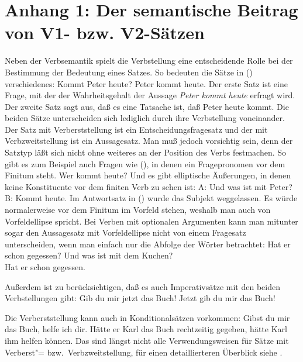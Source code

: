 \section{Anhang 1: Der semantische Beitrag von V1- bzw. V2-Sätzen}
\label{sec-semantik-v1-v2}

%

Neben der Verbsemantik spielt die Verbstellung eine entscheidende Rolle bei der
Bestimmung der Bedeutung eines Satzes. So bedeuten die Sätze in () verschiedenes:
\eal
\ex Kommt Peter heute? 
\ex Peter kommt heute.
\zl
Der erste Satz ist eine Frage, mit der der Wahrheitsgehalt der Aussage \emph{Peter kommt heute}
erfragt wird. Der zweite Satz sagt aus, daß es eine Tatsache ist, daß Peter heute kommt. Die beiden
Sätze unterscheiden sich lediglich durch ihre Verbstellung voneinander. Der Satz mit Verberststellung
ist ein Entscheidungsfragesatz und der mit Verbzweitstellung ist ein
Aussagesatz. Man muß jedoch vorsichtig sein, denn der Satztyp läßt sich
nicht ohne weiteres an der Position des Verbs festmachen. So gibt es zum Beispiel auch Fragen wie
(), in denen ein Fragepronomen vor dem Finitum steht.
\ea
Wer kommt heute?
\z
Und es gibt elliptische Äußerungen, in denen keine Konstituente vor dem finiten Verb zu sehen ist:
\ea
A: Und was ist mit Peter?\\
B: Kommt heute.
\z
Im Antwortsatz in () wurde das Subjekt weggelassen. Es würde normalerweise vor dem Finitum im Vorfeld
stehen, weshalb man auch von Vorfeldellipse spricht.
Bei Verben mit optionalen Argumenten kann man mitunter sogar den Aussagesatz mit Vorfeldellipse
nicht von einem Fragesatz unterscheiden, wenn man einfach nur die Abfolge der Wörter betrachtet:
\eal
\label{bsp-hat-er-gegessen}
\ex Hat er schon gegessen?
\ex Und was ist mit dem Kuchen?\\
    Hat er schon gegessen.
\zl

\noindent
Außerdem ist zu berücksichtigen, daß es auch Imperativsätze mit den beiden Verbstellungen gibt:
\eal
\ex Gib du mir jetzt das Buch!
\ex Jetzt gib du mir das Buch!
\zl

\noindent
Die Verberststellung kann auch in Konditionalsätzen vorkommen:
\eal
\ex Gibst du mir das Buch, helfe ich dir.
\ex Hätte er Karl das Buch rechtzeitig gegeben, hätte Karl ihm helfen können.
\zl
Das sind längst nicht alle Verwendungsweisen für Sätze mit Verberst"= bzw.\ Verbzweitstellung,
für einen detaillierteren Überblick siehe .

